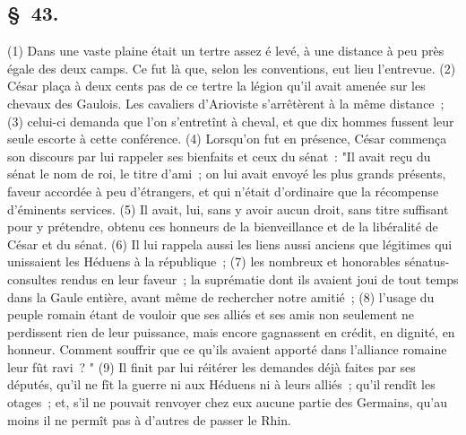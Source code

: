 \documentclass[french,twoside]{book} %
\begin{document}
\subsection[{§ 43.}]{ \textsc{§ 43.} }
\noindent (1) Dans une vaste plaine était un tertre assez é levé, à une distance à peu près égale des deux camps. Ce fut là que, selon les conventions, eut lieu l’entrevue. (2) César plaça à deux cents pas de ce tertre la légion qu’il avait amenée sur les chevaux des Gaulois. Les cavaliers d’Arioviste s’arrêtèrent à la même distance ; (3) celui-ci demanda que l’on s’entretînt à cheval, et que dix hommes fussent leur seule escorte à cette conférence. (4) Lorsqu’on fut en présence, César commença son discours par lui rappeler ses bienfaits et ceux du sénat : "Il avait reçu du sénat le nom de roi, le titre d’ami ; on lui avait envoyé les plus grands présents, faveur accordée à peu d’étrangers, et qui n’était d’ordinaire que la récompense d’éminents services. (5) Il avait, lui, sans y avoir aucun droit, sans titre suffisant pour y prétendre, obtenu ces honneurs de la bienveillance et de la libéralité de César et du sénat. (6) Il lui rappela aussi les liens aussi anciens que légitimes qui unissaient les Héduens à la république ; (7) les nombreux et honorables sénatus-consultes rendus en leur faveur ; la suprématie dont ils avaient joui de tout temps dans la Gaule entière, avant même de rechercher notre amitié ; (8) l’usage du peuple romain étant de vouloir que ses alliés et ses amis non seulement ne perdissent rien de leur puissance, mais encore gagnassent en crédit, en dignité, en honneur. Comment souffrir que ce qu’ils avaient apporté dans l’alliance romaine leur fût ravi ? " (9) Il finit par lui réitérer les demandes déjà faites par ses députés, qu’il ne fît la guerre ni aux Héduens ni à leurs alliés ; qu’il rendît les otages ; et, s’il ne pouvait renvoyer chez eux aucune partie des Germains, qu’au moins il ne permît pas à d’autres de passer le Rhin.
\end{document}
